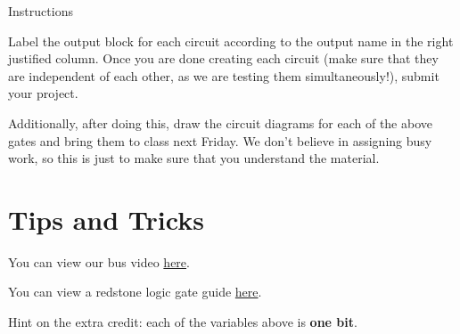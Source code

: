 \documentclass{article}
\begin{document}
\begin{subenv}{Instructions}
    \par Label the output block for each circuit according to the output name in the right justified column.  Once you are done creating each circuit (make sure that they are independent of each other, as we are testing them simultaneously!), submit your project.
    
    \par Additionally, after doing this, draw the circuit diagrams for each of the above gates and bring them to class next Friday.  We don't believe in assigning busy work, so this is just to make sure that you understand the material.
    
    

    
\end{subenv}

\section{Tips and Tricks}

\par You can view our bus video \href{https://youtu.be/oBg1P-EZ4QM}{here}.

\par You can view a redstone logic gate guide \href{https://img.wonderhowto.com/img/63/63/63472386317584/0/redstone-logic-gates-mastering-fundamental-building-blocks-for-creating-game-machines.w1456.jpg}{here}.

\par Hint on the extra credit: each of the variables above is \textbf{one bit}.
\end{document}
